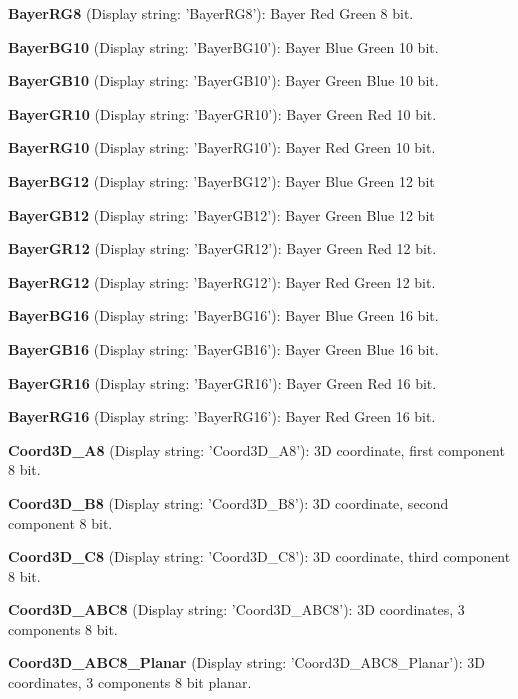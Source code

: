 \begin{DoxyItemize}
\item {\bfseries Bayer\+R\+G8} (Display string\+: 'Bayer\+R\+G8')\+: Bayer Red Green 8 bit.
\item {\bfseries Bayer\+B\+G10} (Display string\+: 'Bayer\+B\+G10')\+: Bayer Blue Green 10 bit.
\item {\bfseries Bayer\+G\+B10} (Display string\+: 'Bayer\+G\+B10')\+: Bayer Green Blue 10 bit.
\item {\bfseries Bayer\+G\+R10} (Display string\+: 'Bayer\+G\+R10')\+: Bayer Green Red 10 bit.
\item {\bfseries Bayer\+R\+G10} (Display string\+: 'Bayer\+R\+G10')\+: Bayer Red Green 10 bit.
\item {\bfseries Bayer\+B\+G12} (Display string\+: 'Bayer\+B\+G12')\+: Bayer Blue Green 12 bit
\item {\bfseries Bayer\+G\+B12} (Display string\+: 'Bayer\+G\+B12')\+: Bayer Green Blue 12 bit
\item {\bfseries Bayer\+G\+R12} (Display string\+: 'Bayer\+G\+R12')\+: Bayer Green Red 12 bit.
\item {\bfseries Bayer\+R\+G12} (Display string\+: 'Bayer\+R\+G12')\+: Bayer Red Green 12 bit.
\item {\bfseries Bayer\+B\+G16} (Display string\+: 'Bayer\+B\+G16')\+: Bayer Blue Green 16 bit.
\item {\bfseries Bayer\+G\+B16} (Display string\+: 'Bayer\+G\+B16')\+: Bayer Green Blue 16 bit.
\item {\bfseries Bayer\+G\+R16} (Display string\+: 'Bayer\+G\+R16')\+: Bayer Green Red 16 bit.
\item {\bfseries Bayer\+R\+G16} (Display string\+: 'Bayer\+R\+G16')\+: Bayer Red Green 16 bit.
\item {\bfseries Coord3\+D\+\_\+\+A8} (Display string\+: 'Coord3\+D\+\_\+\+A8')\+: 3\+D coordinate, first component 8 bit.
\item {\bfseries Coord3\+D\+\_\+\+B8} (Display string\+: 'Coord3\+D\+\_\+\+B8')\+: 3\+D coordinate, second component 8 bit.
\item {\bfseries Coord3\+D\+\_\+\+C8} (Display string\+: 'Coord3\+D\+\_\+\+C8')\+: 3\+D coordinate, third component 8 bit.
\item {\bfseries Coord3\+D\+\_\+\+A\+B\+C8} (Display string\+: 'Coord3\+D\+\_\+\+A\+B\+C8')\+: 3\+D coordinates, 3 components 8 bit.
\item {\bfseries Coord3\+D\+\_\+\+A\+B\+C8\+\_\+\+Planar} (Display string\+: 'Coord3\+D\+\_\+\+A\+B\+C8\+\_\+\+Planar')\+: 3\+D coordinates, 3 components 8 bit planar.

\end{DoxyItemize}
